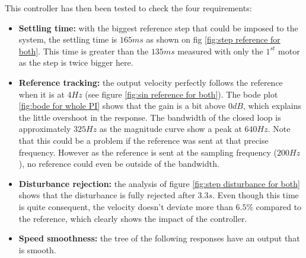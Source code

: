 This controller has then been tested to check the four requirements:

\begin{itemize}
    \item \textbf{Settling time:} with the biggest reference step that could be imposed to the
    system, the settling time is $165 ms$ as shown on fig \ref{fig:step reference for both}. 
    This time is greater than the $135 ms$ measured with only the $1^{st}$ motor as the step is 
    twice bigger here.
    \item \textbf{Reference tracking:} the output velocity perfectly follows the reference when it
    is at $4 Hz$ (see figure \ref{fig:sin reference for both}). The bode plot \ref{fig:bode for whole PI} shows that the gain is a bit above $0 dB$, which explains the little overshoot in the response. The bandwidth of the closed loop is approximately $325 Hz$ as the magnitude curve show a peak at $640 Hz$. Note that this could be a problem if the reference was sent at that precise frequency. However as the reference is sent at the sampling frequency ($200 Hz$), no reference could even be outside of the bandwidth.
    \item \textbf{Disturbance rejection:} the analysis of figure 
    \ref{fig:step disturbance for both} shows that the disturbance is fully rejected after $3.3 s$.
    Even though this time is quite consequent, the velocity doesn't deviate more than $6.5 \%$
    compared to the reference, which clearly shows the impact of the controller.
    \item \textbf{Speed smoothness:} the tree of the following responses have an output that is smooth.
\end{itemize}

